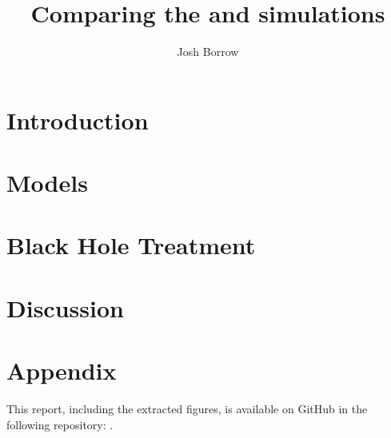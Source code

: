 \documentclass[a4paper]{article}
\author{Josh Borrow}
\title{Comparing the \hagn{} and \fire{} simulations}
\begin{document}
\maketitle

\section{Introduction}\label{sec:intro}


\section{Models}\label{sec:models}


\section{Black Hole Treatment}\label{sec:bhs}


\section{Discussion}\label{sec:discussion}


\section{Appendix}\label{sec:appendix}

This report, including the extracted figures, is available on GitHub in the
following repository: \url{}.


\end{document}
